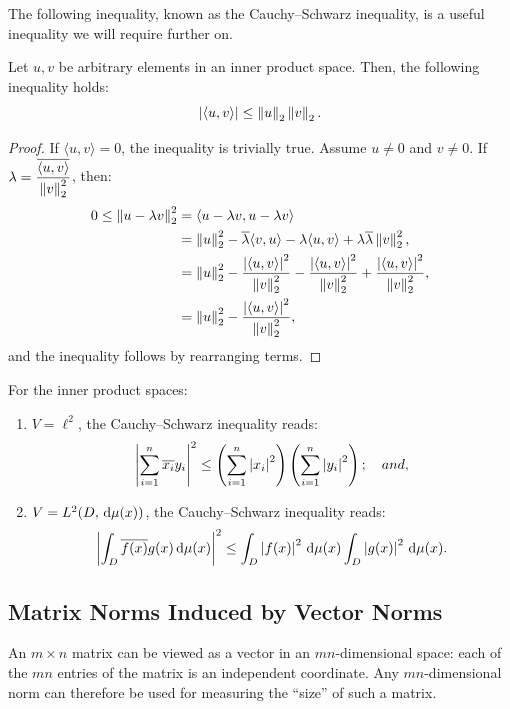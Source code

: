 The following inequality, known as the Cauchy--Schwarz inequality, is a useful inequality we will require further on.
\begin{theorem}
Let $u,v$ be arbitrary elements in an inner product space. Then, the following inequality holds:
\begin{equation}
\left|{\langle u,v\rangle}\right| \le \left\|{u}\right\|_2\left\|{v}\right\|_2.
\end{equation}
\end{theorem}
\begin{proof}
If $\langle u,v\rangle =0$, the inequality is trivially true. Assume $u\ne 0$ and $v\ne 0$. If $\lambda = \dfrac{\overline{\langle u,v\rangle}}{\left\|{v}\right\|_2^2}$, then:
\begin{align*}
0 \le \left\|{u-\lambda v}\right\|_2^2 & = \langle u-\lambda v,u-\lambda v\rangle\\
& = \left\|{u}\right\|_2^2 -\overline{\lambda}\langle v,u\rangle - \lambda\langle u,v\rangle +\lambda\overline{\lambda}\left\|{v}\right\|_2^2,\\
& = \left\|{u}\right\|_2^2 -\dfrac{\left|{\langle u,v\rangle}\right|^2}{\left\|{v}\right\|_2^2} - \dfrac{\left|{\langle u,v\rangle}\right|^2}{\left\|{v}\right\|_2^2} +\dfrac{\left|{\langle u,v\rangle}\right|^2}{\left\|{v}\right\|_2^2},\\
& = \left\|{u}\right\|_2^2 -\dfrac{\left|{\langle u,v\rangle}\right|^2}{\left\|{v}\right\|_2^2},
\end{align*}
and the inequality follows by rearranging terms.
\end{proof}

\begin{example}
For the inner product spaces:
\begin{enumerate}
\item $V=\ell^2$, the Cauchy--Schwarz inequality reads:
\[
\left|{\sum_{i=1}^n \overline{x_i}y_i}\right|^2 \le \left(\sum_{i=1}^n\left|{x_i}\right|^2\right)\left(\sum_{i=1}^n\left|{y_i}\right|^2\right);\quad and,
\]
\item $V=L^2(D,{\rm\,d}\mu(x))$, the Cauchy--Schwarz inequality reads:
\[
\left|{\int_D\overline{f(x)}g(x){\rm\,d}\mu(x)}\right|^2 \le \int_D\left|{f(x)}\right|^2{\rm\,d}\mu(x)\int_D\left|{g(x)}\right|^2{\rm\,d}\mu(x).
\]
\end{enumerate}
\end{example}

\subsection{Matrix Norms Induced by Vector Norms}

An $m\times n$ matrix can be viewed as a vector in an $mn$-dimensional space: each of the $mn$ entries of the matrix is an independent coordinate. Any $mn$-dimensional norm can therefore be used for measuring the ``size'' of such a matrix.

